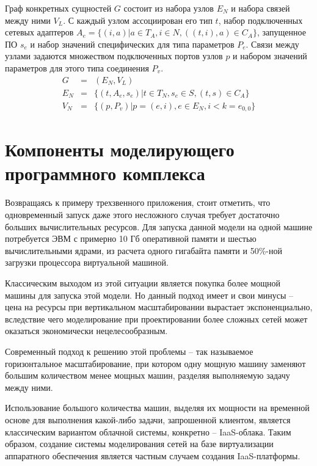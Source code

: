 Граф конкретных сущностей $G$ состоит из 
набора узлов $E_N$ и набора связей между ними $V_L$. 
С каждый узлом ассоциирован его тип $t$, набор подключенных сетевых адаптеров 
$A_e = \{(i, a)| a \in T_A, i \in N, ((t, i), a) \in C_A\}$, запущенное ПО $s_e$ и 
набор значений специфических для типа параметров $P_e$. 
Связи между узлами задаются множеством подключенных портов узлов $p$ 
и набором значений параметров для этого типа соединения $P_v$.
\begin{eqnarray}
    G &=& (E_N, V_L) \\
    E_N &=& \{ (t, A_e, s_e) | t \in T_N,  
                                          s_e \in S,  
                                          (t,s) \in C_A\} \\
    V_N &=& \{ (p, P_v) | p = (e, i), e \in E_N, i < k = e_{0,0} \}    
\end{eqnarray}

\section{Компоненты моделирующего программного комплекса}

Возвращаясь к примеру трехзвенного приложения, стоит отметить, что одновременный запуск
даже этого несложного случая требует достаточно больших вычислительных ресурсов.
Для запуска данной модели на одной машине потребуется ЭВМ с примерно 10 Гб оперативной
памяти и шестью вычислительными ядрами, из расчета одного гигабайта памяти и 50\%-ной
загрузки процессора виртуальной машиной.

Классическим выходом из этой ситуации является покупка более мощной машины для запуска
этой модели. Но данный подход имеет и свои минусы -- цена на ресурсы при вертикальном
масштабировании вырастает экспоненциально, вследствие чего моделирование при 
проектировании более сложных сетей может оказаться экономически нецелесообразным.

Современный подход к решению этой проблемы -- так называемое горизонтальное 
масштабирование, при котором одну мощную машину заменяют большим количеством
менее мощных машин, разделяя выполняемую задачу между ними.

Использование большого количества машин, выделяя их мощности на временной основе для
выполнения какой-либо задачи, запрошенной клиентом, является классическим вариантом
облачной системы, конкретно --  IaaS-облака.
Таким образом, создание системы моделирования сетей на базе виртуализации 
аппаратного обеспечения является частным случаем создания IaaS-платформы.


